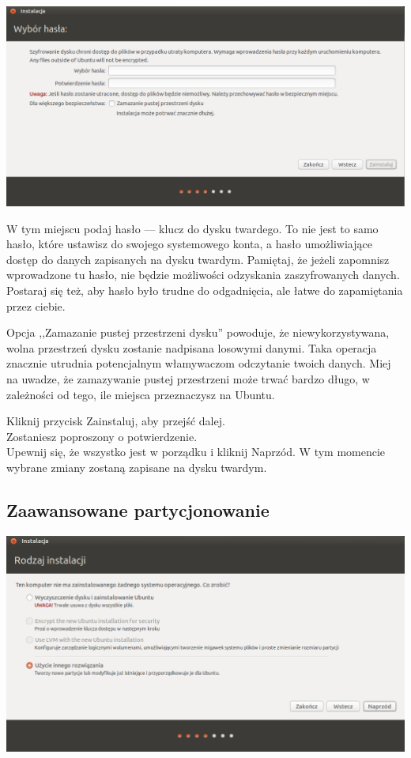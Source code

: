 \begin{center}
	\includegraphics[width=\linewidth]{images/instalator_partycjonowanie_szyfrowanie2.png}
\end{center}

W tym miejscu podaj hasło --- klucz do dysku twardego. To nie jest to samo hasło, które ustawisz do swojego systemowego konta, a hasło umożliwiające dostęp do danych zapisanych na dysku twardym. Pamiętaj, że jeżeli zapomnisz wprowadzone tu hasło, nie będzie możliwości odzyskania zaszyfrowanych danych. Postaraj się też, aby hasło było trudne do odgadnięcia, ale łatwe do zapamiętania przez ciebie.

Opcja ,,Zamazanie pustej przestrzeni dysku'' powoduje, że niewykorzystywana, wolna przestrzeń dysku zostanie nadpisana losowymi danymi. Taka operacja znacznie utrudnia potencjalnym włamywaczom odczytanie twoich danych. Miej na uwadze, że zamazywanie pustej przestrzeni może trwać bardzo długo, w zależności od tego, ile miejsca przeznaczysz na Ubuntu.
\begin{flushright}
Kliknij przycisk \textcolor{ubuntu_orange}{Zainstaluj}, aby przejść dalej.\\
Zostaniesz poproszony o potwierdzenie.\\
Upewnij się, że wszystko jest w porządku i kliknij \textcolor{ubuntu_orange}{Naprzód}.
W tym momencie wybrane zmiany zostaną zapisane na dysku twardym.\\
\end{flushright}
\clearpage
\subsection{Zaawansowane partycjonowanie}
\begin{center}
	\includegraphics[width=\linewidth]{images/instalator_partycjonowanie_gparted1.png}
\end{center}

